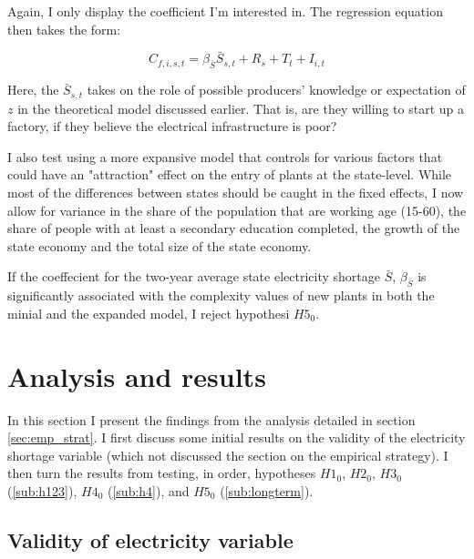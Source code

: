 \documentclass[11pt]{article}
\begin{document}
Again, I only display the coefficient I'm interested in. The regression equation then takes the form:

\begin{equation}
\label{eqn:entry}
C_{f,i,s,t} = \beta_{\bar{S}} \bar{S}_{s,t} + R_{s} + T_{t} + I_{i,t} 
\end{equation}

Here, the $\bar{S}_{s,t}$ takes on the role of possible producers' knowledge or expectation of $z$ in the theoretical model discussed earlier. That is, are they willing to start up a factory, if they believe the electrical infrastructure is poor?

I also test using a more expansive model that controls for various factors that could have an "attraction" effect on the entry of plants at the state-level. While most of the differences between states should be caught in the fixed effects, I now allow for variance in the share of the population that are working age (15-60), the share of people with at least a secondary education completed, the growth of the state economy and the total size of the state economy. 

If the coeffecient for the two-year average state electricity shortage $\bar{S}$, $\beta_{\bar{S}}$ is significantly associated with the complexity values of new plants in both the minial and the expanded model, I reject hypothesi $H5_0$.


\newpage

\section{Analysis and results}%
\label{sec:analysis_and_results}
In this section I present the findings from the analysis detailed in section \ref{sec:emp_strat}. I first discuss some initial results on the validity of the electricity shortage variable (which not discussed the section on the empirical strategy). I then turn the results from testing, in order, hypotheses $H1_0$, $H2_0$, $H3_0$ (\ref{sub:h123}), $H4_0$ (\ref{sub:h4}), and $H5_0$ (\ref{sub:longterm}).

\subsection{Validity of electricity variable}%
\label{sub:validity_of_electricity_variable}
\end{document}
